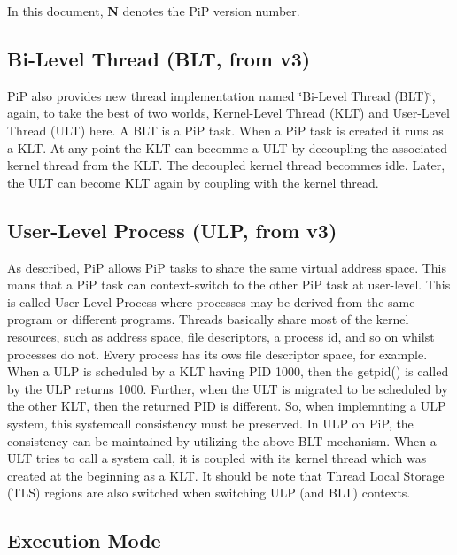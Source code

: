 \documentclass[twoside]{book}
\begin{document}
In this document, {\bfseries N} denotes the Pi\-P version number.

\subsection*{Bi-\/\-Level Thread (B\-L\-T, from v3)}

Pi\-P also provides new thread implementation named \char`\"{}\-Bi-\/\-Level Thread
(\-B\-L\-T)\char`\"{}, again, to take the best of two worlds, Kernel-\/\-Level Thread (K\-L\-T) and User-\/\-Level Thread (U\-L\-T) here. A B\-L\-T is a Pi\-P task. When a Pi\-P task is created it runs as a K\-L\-T. At any point the K\-L\-T can becomme a U\-L\-T by decoupling the associated kernel thread from the K\-L\-T. The decoupled kernel thread becommes idle. Later, the U\-L\-T can become K\-L\-T again by coupling with the kernel thread.

\subsection*{User-\/\-Level Process (U\-L\-P, from v3)}

As described, Pi\-P allows Pi\-P tasks to share the same virtual address space. This mans that a Pi\-P task can context-\/switch to the other Pi\-P task at user-\/level. This is called User-\/\-Level Process where processes may be derived from the same program or different programs. Threads basically share most of the kernel resources, such as address space, file descriptors, a process id, and so on whilst processes do not. Every process has its ows file descriptor space, for example. When a U\-L\-P is scheduled by a K\-L\-T having P\-I\-D 1000, then the getpid() is called by the U\-L\-P returns 1000. Further, when the U\-L\-T is migrated to be scheduled by the other K\-L\-T, then the returned P\-I\-D is different. So, when implemnting a U\-L\-P system, this systemcall consistency must be preserved. In U\-L\-P on Pi\-P, the consistency can be maintained by utilizing the above B\-L\-T mechanism. When a U\-L\-T tries to call a system call, it is coupled with its kernel thread which was created at the beginning as a K\-L\-T. It should be note that Thread Local Storage (T\-L\-S) regions are also switched when switching U\-L\-P (and B\-L\-T) contexts.

\subsection*{Execution Mode}
\end{document}

